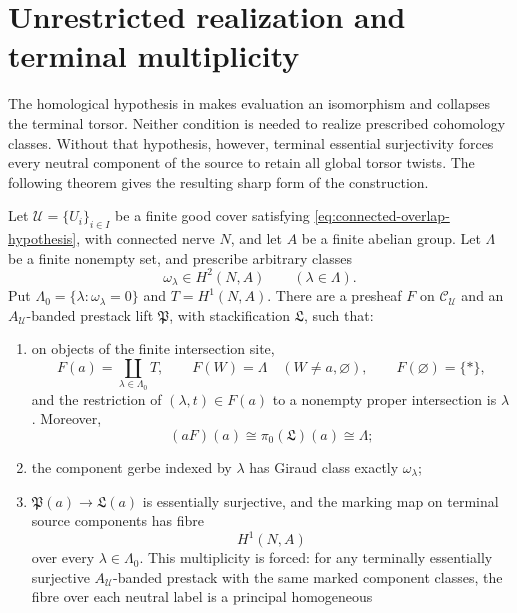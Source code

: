 \section{Unrestricted realization and terminal multiplicity}
\label{sec:unrestricted-realization}

The homological hypothesis in
 makes evaluation an
isomorphism and collapses the terminal torsor.  Neither condition is needed
to realize prescribed cohomology classes.  Without that hypothesis, however,
terminal essential surjectivity forces every neutral component of the source
to retain all global torsor twists.  The following theorem gives the resulting
sharp form of the construction.

\begin{theorem}
\label{thm:unrestricted-component-class-realization}
Let \(\mathcal U=\{U_i\}_{i\in I}\) be a finite good cover satisfying
\eqref{eq:connected-overlap-hypothesis}, with connected nerve \(N\), and let
\(A\) be a finite abelian group.  Let \(\Lambda\) be a finite nonempty set,
and prescribe arbitrary classes
\[
 \omega_\lambda\in H^2(N,A)
 \qquad(\lambda\in\Lambda).
\]
Put \(\Lambda_0=\{\lambda:\omega_\lambda=0\}\) and
\(T=H^1(N,A)\).  There are a presheaf \(F\) on
\(\mathcal C_{\mathcal U}\) and an
\(A_{\mathcal U}\)-banded prestack lift \(\mathfrak P\), with
stackification \(\mathfrak L\), such that:
\begin{enumerate}[label=(\roman*),nosep]
\item on objects of the finite intersection site,
      \[
      F(a)=\coprod_{\lambda\in\Lambda_0}T,
      \qquad
      F(W)=\Lambda\quad
      (W\ne a,\varnothing),
      \qquad
      F(\varnothing)=\{*\},
      \]
      and the restriction of \((\lambda,t)\in F(a)\) to a nonempty
      proper intersection is \(\lambda\).  Moreover,
      \[
      (aF)(a)\cong\pi_0(\mathfrak L)(a)\cong\Lambda;
      \]
\item the component gerbe indexed by \(\lambda\) has Giraud class exactly
      \(\omega_\lambda\);
\item \(\mathfrak P(a)\to\mathfrak L(a)\) is essentially surjective, and
      the marking map on terminal source components has fibre
      \[
      H^1(N,A)
      \]
      over every \(\lambda\in\Lambda_0\).  This multiplicity is forced:
      for any terminally essentially surjective
      \(A_{\mathcal U}\)-banded prestack with the same marked component
      classes, the fibre over each neutral label is a principal homogeneous

\end{enumerate}
\end{theorem}
